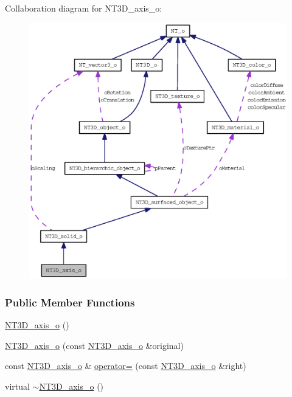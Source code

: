 Collaboration diagram for NT3D\_\-axis\_\-o:
\nopagebreak
\begin{figure}[H]
\begin{center}
\leavevmode
\includegraphics[width=400pt]{class_n_t3_d__axis__o__coll__graph}
\end{center}
\end{figure}
\subsubsection*{Public Member Functions}
\begin{DoxyCompactItemize}
\item 
\hyperlink{class_n_t3_d__axis__o_a54a692133b183a10f1b45991d7edb120}{NT3D\_\-axis\_\-o} ()
\item 
\hyperlink{class_n_t3_d__axis__o_a1f5a3194c977fa85e8dcac9b5754d6aa}{NT3D\_\-axis\_\-o} (const \hyperlink{class_n_t3_d__axis__o}{NT3D\_\-axis\_\-o} \&original)
\item 
const \hyperlink{class_n_t3_d__axis__o}{NT3D\_\-axis\_\-o} \& \hyperlink{class_n_t3_d__axis__o_a0fb015f64f24b90b5ff97dc3af064a51}{operator=} (const \hyperlink{class_n_t3_d__axis__o}{NT3D\_\-axis\_\-o} \&right)
\item 
virtual \hyperlink{class_n_t3_d__axis__o_ae587dd7c283dff858eb2fa24d9357cc8}{$\sim$NT3D\_\-axis\_\-o} ()
\end{DoxyCompactItemize}


